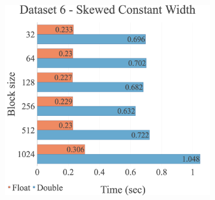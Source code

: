 \begin{figure}[H]
\begin{adjustwidth}{-2cm}{-2cm}
\begin{subfigure}{.62\textwidth}
\end{subfigure}
\par\bigskip
\par\bigskip
\centering
\begin{subfigure}{.62\textwidth}
  \includegraphics[width=1\textwidth]{img/experiments/option-blocks-6_SKEWEDCONSTWIDTH.png}
\end{subfigure}
\end{adjustwidth}
\end{figure}


